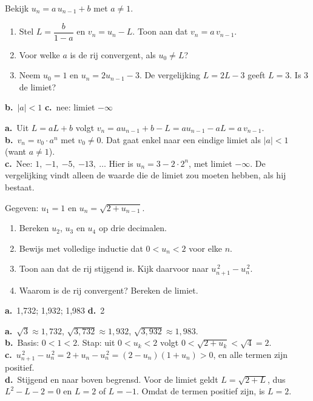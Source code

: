 \begin{oefeningen}
\begin{oefening}[3]
Bekijk $u_n = a\,u_{n-1} + b$ met $a \neq 1$.
\begin{enumerate}
  \item Stel $L = \dfrac{b}{1-a}$ en $v_n = u_n - L$. Toon aan dat $v_n = a\,v_{n-1}$.
  \item Voor welke $a$ is de rij convergent, als $u_0 \neq L$?
  \item Neem $u_0 = 1$ en $u_n = 2u_{n-1} - 3$. De vergelijking $L = 2L - 3$ geeft $L = 3$. Is 3 de limiet?
\end{enumerate}
\begin{solution}
\textbf{b.}~$|a|<1$ \quad \textbf{c.}~nee: limiet $-\infty$
\end{solution}
\begin{fullsolution}
\textbf{a.}~Uit $L=aL+b$ volgt $v_n=au_{n-1}+b-L=au_{n-1}-aL=a\,v_{n-1}$.\\
\textbf{b.}~$v_n=v_0\cdot a^n$ met $v_0\neq 0$. Dat gaat enkel naar een eindige limiet als $|a|<1$ (want $a\neq 1$).\\
\textbf{c.}~Nee: $1,\ {-1},\ {-5},\ {-13},\ \ldots$ Hier is $u_n=3-2\cdot 2^n$, met limiet $-\infty$. De vergelijking vindt alleen de waarde die de limiet zou moeten hebben, als hij bestaat.
\end{fullsolution}
\end{oefening}

\begin{oefening}[3]
Gegeven: $u_1 = 1$ en $u_n = \sqrt{2 + u_{n-1}}$.
\begin{enumerate}
  \item Bereken $u_2$, $u_3$ en $u_4$ op drie decimalen.
  \item Bewijs met volledige inductie dat $0 < u_n < 2$ voor elke $n$.
  \item Toon aan dat de rij stijgend is. Kijk daarvoor naar $u_{n+1}^{\,2} - u_n^{\,2}$.
  \item Waarom is de rij convergent? Bereken de limiet.
\end{enumerate}
\begin{solution}
\textbf{a.}~1,732; 1,932; 1,983 \quad \textbf{d.}~2
\end{solution}
\begin{fullsolution}
\textbf{a.}~$\sqrt3\approx 1{,}732$, $\sqrt{3{,}732}\approx 1{,}932$, $\sqrt{3{,}932}\approx 1{,}983$.\\
\textbf{b.}~Basis: $0<1<2$. Stap: uit $0<u_k<2$ volgt $0<\sqrt{2+u_k}<\sqrt4=2$.\\
\textbf{c.}~$u_{n+1}^{\,2}-u_n^{\,2}=2+u_n-u_n^{\,2}=(2-u_n)(1+u_n)>0$, en alle termen zijn positief.\\
\textbf{d.}~Stijgend en naar boven begrensd. Voor de limiet geldt $L=\sqrt{2+L}$, dus $L^2-L-2=0$ en $L=2$ of $L=-1$. Omdat de termen positief zijn, is $L=2$.
\end{fullsolution}
\end{oefening}


\end{oefeningen}
